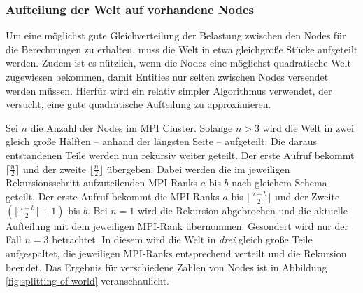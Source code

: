 \documentclass[course=erap]{aspdoc}
\begin{document}


\subsubsection{Aufteilung der Welt auf vorhandene Nodes}
\label{sssec:aufteilung-der-welt}
Um eine möglichst gute Gleichverteilung der Belastung zwischen den Nodes für die Berechnungen zu erhalten, muss die Welt in etwa gleichgroße Stücke aufgeteilt werden. Zudem ist es nützlich, wenn die Nodes eine möglichst quadratische Welt zugewiesen bekommen, damit Entities nur selten zwischen Nodes versendet werden müssen. Hierfür wird ein relativ simpler Algorithmus verwendet, der versucht, eine gute quadratische Aufteilung zu approximieren.

Sei \(n\) die Anzahl der Nodes im MPI Cluster. Solange \(n > 3\) wird die Welt in zwei gleich große Hälften -- anhand der längsten Seite -- aufgeteilt. Die daraus entstandenen Teile werden nun rekursiv weiter geteilt. Der erste Aufruf bekommt \(\lceil\frac{n}{2}\rceil\) und der zweite \(\lfloor\frac{n}{2}\rfloor\) übergeben. Dabei werden die im jeweiligen Rekursionsschritt aufzuteilenden MPI-Ranks \(a\) bis \(b\) nach gleichem Schema geteilt. Der erste Aufruf bekommt die MPI-Ranks \(a\) bis \(\lfloor\frac{a+b}{2}\rfloor\) und der Zweite \((\lfloor\frac{a+b}{2}\rfloor+1)\) bis \(b\). Bei \(n = 1\) wird die Rekursion abgebrochen und die aktuelle Aufteilung mit dem jeweiligen MPI-Rank übernommen. Gesondert wird nur der Fall \(n = 3\) betrachtet. In diesem wird die Welt in \emph{drei} gleich große Teile aufgespaltet, die jeweiligen MPI-Ranks entsprechend verteilt und die Rekursion beendet. Das Ergebnis für verschiedene Zahlen von Nodes ist in Abbildung \ref{fig:splitting-of-world} veranschaulicht.
\end{document}

